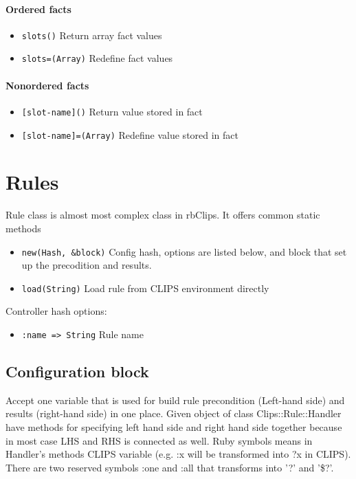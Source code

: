 \documentclass[a4paper,10pt]{article}
\begin{document}
\paragraph{Ordered facts}
\begin{itemize}
 \item \texttt{slots()} Return array fact values
 \item \texttt{slots=(Array)} Redefine fact values
\end{itemize}
\paragraph{Nonordered facts}
\begin{itemize}
 \item \texttt{[slot-name]()} Return value stored in fact
 \item \texttt{[slot-name]=(Array)} Redefine value stored in fact
\end{itemize}

\section{Rules}
Rule class is almost most complex class in rbClips. It offers common static methods
\begin{itemize}
 \item \texttt{new(Hash, \&block)} Config hash, options are listed below, and  block that set up the precodition and results.
 \item \texttt{load(String)} Load rule from CLIPS environment directly
\end{itemize}

Controller hash options:
\begin{itemize}
 \item \texttt{:name => String} Rule name
\end{itemize}

\subsection{Configuration block}
Accept one variable that is used for build rule precondition (Left-hand side) and results (right-hand side) in one place. Given object of class Clips::Rule::Handler have methods for specifying left hand side and right hand side together because in most case LHS and RHS is connected as well. Ruby symbols means in Handler's methods CLIPS variable (e.g. :x will be transformed into ?x in CLIPS). There are two reserved symbols :one and :all that transforms into '?' and '\$?'.
\end{document}
